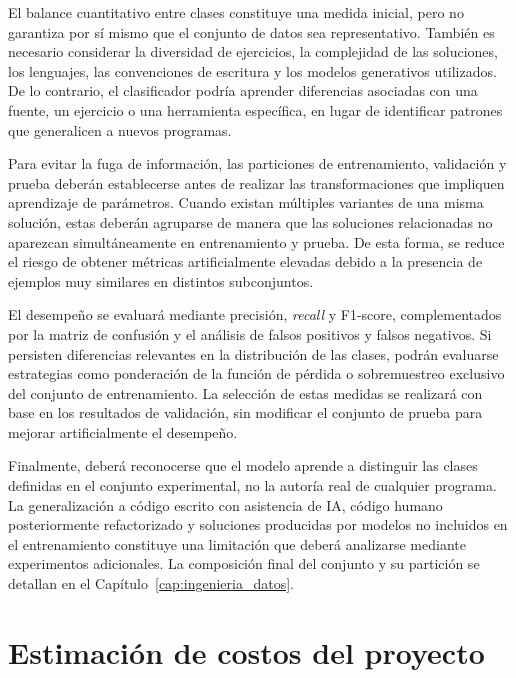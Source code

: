 El balance cuantitativo entre clases constituye una medida inicial, pero no garantiza por sí mismo que el conjunto de datos sea representativo. También es necesario considerar la diversidad de ejercicios, la complejidad de las soluciones, los lenguajes, las convenciones de escritura y los modelos generativos utilizados. De lo contrario, el clasificador podría aprender diferencias asociadas con una fuente, un ejercicio o una herramienta específica, en lugar de identificar patrones que generalicen a nuevos programas.

Para evitar la fuga de información, las particiones de entrenamiento, validación y prueba deberán establecerse antes de realizar las transformaciones que impliquen aprendizaje de parámetros. Cuando existan múltiples variantes de una misma solución, estas deberán agruparse de manera que las soluciones relacionadas no aparezcan simultáneamente en entrenamiento y prueba. De esta forma, se reduce el riesgo de obtener métricas artificialmente elevadas debido a la presencia de ejemplos muy similares en distintos subconjuntos.

El desempeño se evaluará mediante precisión, \textit{recall} y F1-score, complementados por la matriz de confusión y el análisis de falsos positivos y falsos negativos. Si persisten diferencias relevantes en la distribución de las clases, podrán evaluarse estrategias como ponderación de la función de pérdida o sobremuestreo exclusivo del conjunto de entrenamiento. La selección de estas medidas se realizará con base en los resultados de validación, sin modificar el conjunto de prueba para mejorar artificialmente el desempeño.

Finalmente, deberá reconocerse que el modelo aprende a distinguir las clases definidas en el conjunto experimental, no la autoría real de cualquier programa. La generalización a código escrito con asistencia de IA, código humano posteriormente refactorizado y soluciones producidas por modelos no incluidos en el entrenamiento constituye una limitación que deberá analizarse mediante experimentos adicionales. La composición final del conjunto y su partición se detallan en el Capítulo~\ref{cap:ingenieria_datos}.

\section{Estimación de costos del proyecto}
\label{sec:costos}

